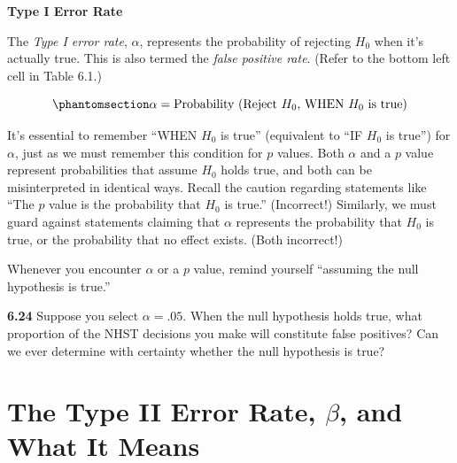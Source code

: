 \documentclass[
  letterpaper,
  DIV=11,
  numbers=noendperiod]{scrreprt}
\begin{document}
\begin{tcolorbox}[enhanced jigsaw, colframe=quarto-callout-note-color-frame, left=2mm, leftrule=.75mm, rightrule=.15mm, opacityback=0, arc=.35mm, colback=white, bottomrule=.15mm, breakable, toprule=.15mm]
\begin{minipage}[t]{5.5mm}
\textcolor{quarto-callout-note-color}{\faInfo}
\end{minipage}%
\begin{minipage}[t]{\textwidth - 5.5mm}

\vspace{-3mm}\textbf{Type I Error Rate}\vspace{3mm}

The \emph{Type I error rate}, \(\alpha\), represents the probability of
rejecting \(H_0\) when it's actually true. This is also termed the
\emph{false positive rate}. (Refer to the bottom left cell in Table
6.1.)

\end{minipage}%
\end{tcolorbox}

\begin{equation}\phantomsection\label{eq-alpha}{
\alpha = \text{Probability (Reject } H_0\text{, WHEN } H_0 \text{ is true)}
}\end{equation}

It's essential to remember ``WHEN \(H_0\) is true'' (equivalent to ``IF
\(H_0\) is true'') for \(\alpha\), just as we must remember this
condition for \(p\) values. Both \(\alpha\) and a \(p\) value represent
probabilities that assume \(H_0\) holds true, and both can be
misinterpreted in identical ways. Recall the caution regarding
statements like ``The \(p\) value is the probability that \(H_0\) is
true.'' (Incorrect!) Similarly, we must guard against statements
claiming that \(\alpha\) represents the probability that \(H_0\) is
true, or the probability that no effect exists. (Both incorrect!)

Whenever you encounter \(\alpha\) or a \(p\) value, remind yourself
``assuming the null hypothesis is true.''

\textbf{6.24} Suppose you select \(\alpha = .05\). When the null
hypothesis holds true, what proportion of the NHST decisions you make
will constitute false positives? Can we ever determine with certainty
whether the null hypothesis is true?

\section{\texorpdfstring{The Type II Error Rate, \(\beta\), and What It
Means}{The Type II Error Rate, \textbackslash beta, and What It Means}}\label{the-type-ii-error-rate-beta-and-what-it-means}
\end{document}
